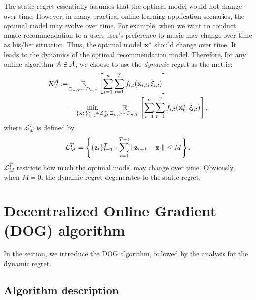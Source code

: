 \documentclass{article}
\begin{document}
The static regret essentially assumes that the optimal model would not change over time. However, in many practical online learning application scenarios, the optimal model may evolve over time. For example, when we want to conduct music recommendation to a user, user's preference to music may change over time as his/her situation.  Thus, the optimal model ${\bf x}^\ast$ should change over time. It leads to the dynamics of the optimal recommendation model. Therefore, for any online algorithm $A\in{\mathcal{A}}$, we choose to use the \emph{dynamic} regret as the metric:
\begin{align}
\label{equa_definition_our_regret}
{\mathcal{R}}_T^{A} := & \mathop{\mathbb{E}}_{ \Xi_{n,T} \sim \mathcal{D}_{n,T} }  \left[\sum_{i=1}^n\sum_{t=1}^T f_{i,t}({\bf x}_{i,t};\xi_{i,t}) \right]
\\ \nonumber
& - \min_{\{{\bf x}_t^\star\}_{t=1}^T \in \mathcal{L}_{M}^T}  \mathop{\mathbb{E}}_{ \Xi_{n,T} \sim \mathcal{D}_{n,T} }\left[\sum_{i=1}^n\sum_{t=1}^T f_{i,t}({\bf x}_t^\ast;\xi_{i,t}) \right],
\end{align}
where $\mathcal{L}_M^T$ is defined by
\begin{align}
\nonumber
{\mathcal{L}}_{M}^T = \left\{\{{\bf z}_t\}_{t=1}^T : \sum\limits_{t=1}^{T-1}\|{\bf z}_{t+1}-{\bf z}_t\|\le M \right\}.
\end{align} $\mathcal{L}_M^T$ restricts how much the optimal model may change over time.
Obviously, when $M=0$, the dynamic regret degenerates to the static regret.






\section{Decentralized Online Gradient (DOG) algorithm} \label{sec:algorithm}
In the section, we introduce the DOG algorithm, followed by the analysis for the dynamic regret.
\subsection{Algorithm description}
\end{document}
